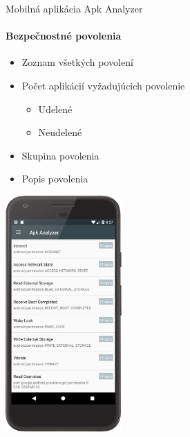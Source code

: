 \documentclass{beamer}
\begin{document}
   
     \begin{frame}[label=lists]{Mobilná aplikácia Apk Analyzer}
 	 \framesubtitle{Bezpečnostné povolenia}
	\begin{minipage}[htb]{\textwidth}
		\begin{minipage}[t]{0.5\textwidth}
			\hbox{}
			\hbox{}
			\hbox{}
			\begin{itemize}
				\item Zoznam všetkých povolení
				\item Počet aplikácií vyžadujúcich povolenie
				\begin{itemize}
					\item Udelené
					\item Neudelené
				\end{itemize}
				\item Skupina povolenia
				\item Popis povolenia
			\end{itemize}
     		\vfill
		\end{minipage}%
	\hfill
	\centering
		\begin{minipage}[t][][b]{0.4\textwidth}
		\centering
		\includegraphics[height=9cm]{images/app/list_permissions_device.png}
		\label{fig:app-detail}
		\end{minipage}%
	\end{minipage}
  \end{frame} 
   
\end{document}
